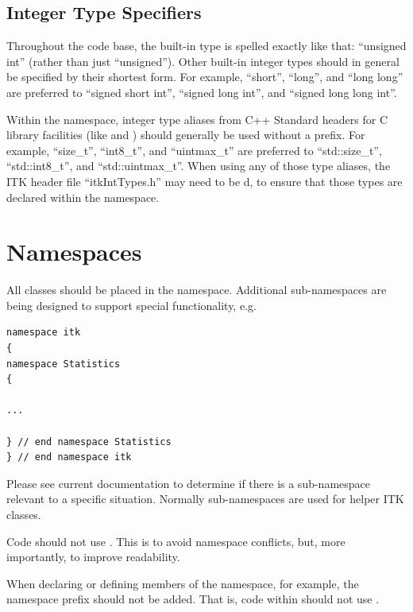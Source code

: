 \subsection{Integer Type Specifiers}%
\label{subsec:IntegerTypeSpecifiers}

Throughout the code base, the built-in type  is spelled exactly like that:
``unsigned int'' (rather than just ``unsigned''). Other built-in integer types should in
general be specified by their shortest form. For example, ``short'', ``long'', and ``long long''
are preferred to ``signed short int'', ``signed long int'', and ``signed long long int''.

Within the  namespace, integer type aliases from C++ Standard headers for C library
facilities (like  and ) should generally be used without a  prefix.
For example, ``size\_t'', ``int8\_t'', and ``uintmax\_t'' are preferred to ``std::size\_t'',
``std::int8\_t'', and ``std::uintmax\_t''. When using any of those type aliases, the ITK header file
``itkIntTypes.h'' may need to be d, to ensure that those types are declared within the
 namespace.

\section{Namespaces}%
\label{sec:Namespaces}

All classes should be placed in the  namespace. Additional
sub-namespaces are being designed to support special functionality, e.g.

\small
\begin{verbatim}
namespace itk
{
namespace Statistics
{

...

} // end namespace Statistics
} // end namespace itk
\end{verbatim}
\normalsize

Please see current documentation to determine if there is a sub-namespace
relevant to a specific situation. Normally sub-namespaces are used for helper ITK
classes.

Code should not use . This is to avoid namespace
conflicts, but, more importantly, to improve readability.

When declaring or defining members of the  namespace, for example,
the  namespace prefix should not be added. That is, code within
 should not use .

